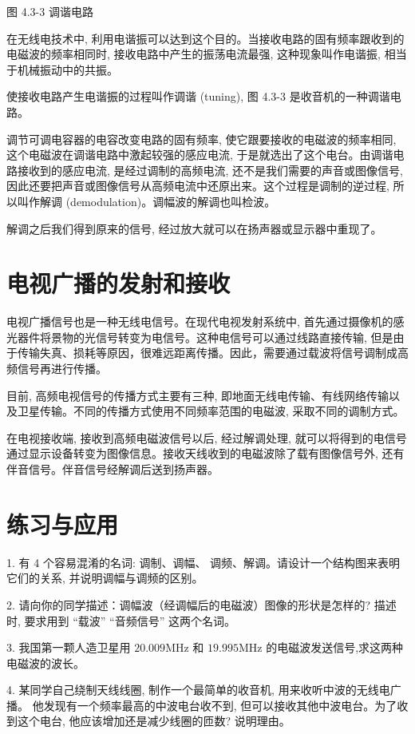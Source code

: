 \documentclass[10pt]{article}
\begin{document}
图 4.3-3 调谐电路

在无线电技术中, 利用电谐振可以达到这个目的。当接收电路的固有频率跟收到的电磁波的频率相同时, 接收电路中产生的振荡电流最强, 这种现象叫作电谐振, 相当于机械振动中的共振。

使接收电路产生电谐振的过程叫作调谐 (tuning), 图 4.3-3 是收音机的一种调谐电路。

调节可调电容器的电容改变电路的固有频率, 使它跟要接收的电磁波的频率相同, 这个电磁波在调谐电路中激起较强的感应电流, 于是就选出了这个电台。由调谐电路接收到的感应电流, 是经过调制的高频电流, 还不是我们需要的声音或图像信号, 因此还要把声音或图像信号从高频电流中还原出来。这个过程是调制的逆过程, 所以叫作解调 (demodulation)。调幅波的解调也叫检波。

解调之后我们得到原来的信号, 经过放大就可以在扬声器或显示器中重现了。

\section*{电视广播的发射和接收}

电视广播信号也是一种无线电信号。在现代电视发射系统中, 首先通过摄像机的感光器件将景物的光信号转变为电信号。这种电信号可以通过线路直接传输, 但是由于传输失真、损耗等原因，很难远距离传播。因此，需要通过载波将信号调制成高频信号再进行传播。

目前, 高频电视信号的传播方式主要有三种, 即地面无线电传输、有线网络传输以及卫星传输。不同的传播方式使用不同频率范围的电磁波, 采取不同的调制方式。

在电视接收端, 接收到高频电磁波信号以后, 经过解调处理, 就可以将得到的电信号通过显示设备转变为图像信息。接收天线收到的电磁波除了载有图像信号外, 还有伴音信号。伴音信号经解调后送到扬声器。

\section*{练习与应用}

1. 有 4 个容易混淆的名词: 调制、调幅、 调频、解调。请设计一个结构图来表明它们的关系, 并说明调幅与调频的区别。

2. 请向你的同学描述：调幅波（经调幅后的电磁波）图像的形状是怎样的? 描述时, 要求用到 “载波” “音频信号” 这两个名词。

3. 我国第一颗人造卫星用 \({20.009}\mathrm{{MHz}}\) 和 \({19.995}\mathrm{{MHz}}\) 的电磁波发送信号,求这两种电磁波的波长。

4. 某同学自己绕制天线线圈, 制作一个最简单的收音机, 用来收听中波的无线电广播。 他发现有一个频率最高的中波电台收不到, 但可以接收其他中波电台。为了收到这个电台, 他应该增加还是减少线圈的匝数? 说明理由。
\end{document}
